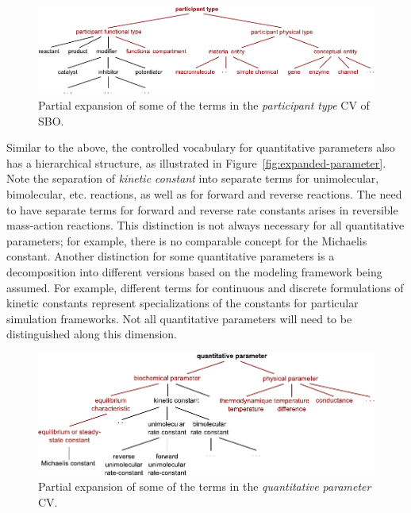 \begin{figure}[htb]
  \vspace*{1ex}
  \centering
  \includegraphics[scale = 0.9]{figs/sbo-participant-type}
  \caption{Partial expansion of some of the terms in the
    \emph{participant type} CV of SBO.}
  \label{fig:expanded-species}
\end{figure}

Similar to the above, the controlled vocabulary for quantitative
parameters also has a hierarchical structure, as illustrated in
Figure~\vref{fig:expanded-parameter}.  Note the separation of
\emph{kinetic constant} into separate terms for unimolecular,
bimolecular, etc. reactions, as well as for forward and
reverse reactions.  The need to have separate terms for forward
and reverse rate constants arises in reversible mass-action
reactions.  This distinction is not always necessary for all
quantitative parameters; for example, there is no comparable
concept for the Michaelis constant.  Another distinction for some
quantitative parameters is a decomposition into different versions
based on the modeling framework being assumed.  For example,
different terms for continuous and discrete formulations of
kinetic constants represent specializations of the constants for
particular simulation frameworks.  Not all quantitative parameters
will need to be distinguished along this dimension.

\begin{figure}[tbh]
  \vspace*{2ex}
  \centering
  \includegraphics[scale = 0.7]{figs/sbo-quantitative-parameter}
  \caption{Partial expansion of some of the terms in the \emph{quantitative
      parameter} CV.}
  \label{fig:expanded-parameter}
\end{figure}

